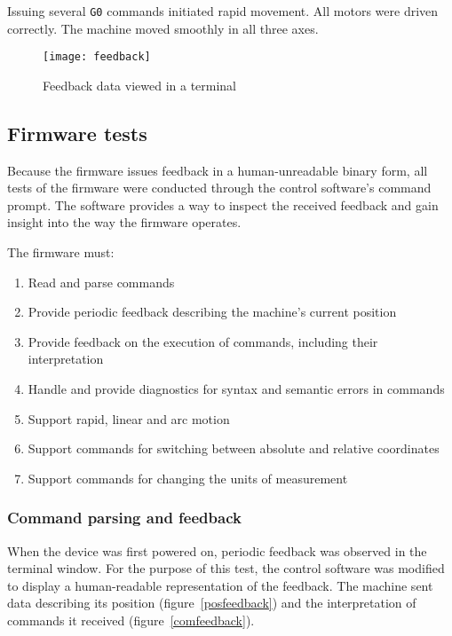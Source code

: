 Issuing several \texttt{G0} commands initiated rapid movement. All motors were
driven correctly. The machine moved smoothly in all three axes.

\begin{figure}[ht]
    \begin{center}
        \texttt{[image: feedback]}
        \caption{Feedback data viewed in a terminal}
        \label{feedback}
    \end{center}
\end{figure}

\subsection{Firmware tests}

Because the firmware issues feedback in a human-unreadable binary form, all
tests of the firmware were conducted through the control software's command
prompt. The software provides a way to inspect the received feedback and gain
insight into the way the firmware operates.

The firmware must:
\begin{enumerate}
    \item Read and parse commands
    \item Provide periodic feedback describing the machine's current position
    \item Provide feedback on the execution of commands, including their
    interpretation
    \item Handle and provide diagnostics for syntax and semantic errors in
    commands
    \item Support rapid, linear and arc motion
    \item Support commands for switching between absolute and relative
    coordinates
    \item Support commands for changing the units of measurement
\end{enumerate}

\subsubsection{Command parsing and feedback}

When the device was first powered on, periodic feedback was observed in the
terminal window. For the purpose of this test, the control software was modified
to display a human-readable representation of the feedback. The machine sent
data describing its position (figure~\ref{posfeedback}) and the interpretation
of commands it received (figure~\ref{comfeedback}).

